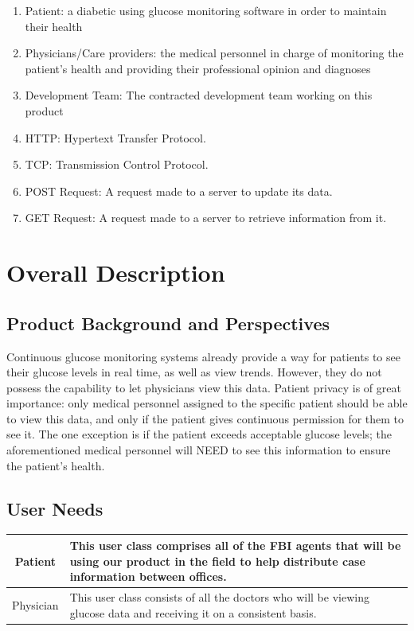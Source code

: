 \documentclass[12pt]{article}
\begin{document}
\begin{enumerate}
    \item Patient: a diabetic using glucose monitoring software in order to maintain their health
    \item Physicians/Care providers: the medical personnel in charge of monitoring the patient's health and providing
    their professional opinion and diagnoses
    \item Development Team: The contracted development team working on this product
    \item HTTP: Hypertext Transfer Protocol.
    \item TCP: Transmission Control Protocol.
    \item POST Request: A request made to a server to update its data.
    \item GET Request: A request made to a server to retrieve information from it.
\end{enumerate}

\section{Overall Description}

\subsection{Product Background and Perspectives}

Continuous glucose monitoring systems already provide a way for patients to see their glucose levels in real time, as
well as view trends. However, they do not possess the capability to let physicians view this data.  Patient privacy
is of great importance: only medical personnel assigned to the specific patient should be able to view this data,
and only if the patient gives continuous permission for them to see it.  The one exception is if the patient exceeds
acceptable glucose levels; the aforementioned medical personnel will NEED to see this information to ensure the patient's health.

\subsection{User Needs}

\begin{center}
    \begin{tabularx}{\linewidth}{|c|X|}
        \hline
        Patient & This user class comprises all of the FBI agents that will be using our product in the field to help
        distribute case information between offices.\\
        \hline
        Physician & This user class consists of all the doctors who will be viewing glucose data and receiving it on a
        consistent basis. \\
        \hline
    \end{tabularx}
\end{center}
\end{document}
